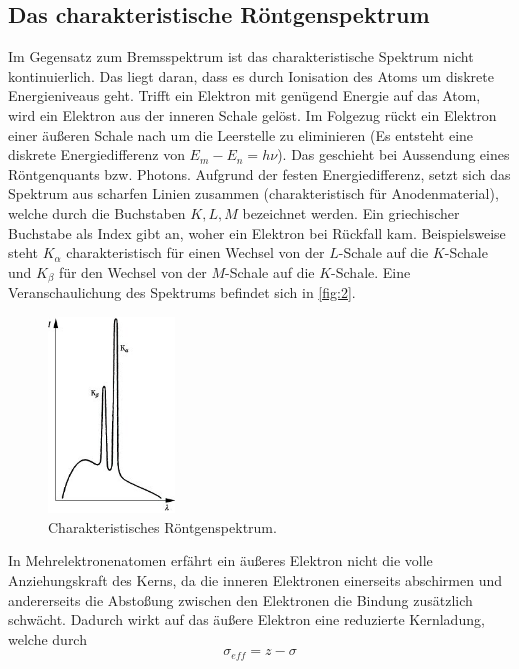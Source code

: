 \subsection{Das charakteristische Röntgenspektrum}
Im Gegensatz zum Bremsspektrum ist das charakteristische Spektrum nicht kontinuierlich.
Das liegt daran, dass es durch Ionisation des Atoms um diskrete Energieniveaus 
geht. Trifft ein Elektron mit genügend Energie auf das Atom, wird ein Elektron 
aus der inneren Schale gelöst. Im Folgezug rückt ein Elektron einer äußeren 
Schale nach um die Leerstelle zu eliminieren (Es entsteht eine diskrete 
Energiedifferenz von $E_m -E_n = h \nu$). Das geschieht bei Aussendung eines 
Röntgenquants bzw. Photons. Aufgrund der festen Energiedifferenz, setzt sich 
das Spektrum aus scharfen Linien zusammen (charakteristisch für Anodenmaterial),
welche durch die Buchstaben $K,L,M$ bezeichnet werden. Ein griechischer Buchstabe 
als Index gibt an, woher ein Elektron bei Rückfall kam. Beispielsweise steht 
$K_{\alpha}$ charakteristisch für einen Wechsel von der $L$-Schale auf die $K$-Schale 
und $K_{\beta}$ für den Wechsel von der $M$-Schale auf die $K$-Schale. Eine 
Veranschaulichung des Spektrums befindet sich in \autoref{fig:2}.
\begin{figure}[H]
    \centering
        \centering
        \includegraphics[width=0.3\textwidth]{bilder/char.jpg}
        \caption{Charakteristisches Röntgenspektrum. \cite{char}}
    \hfill
    \label{fig:2}
\end{figure}
\noindent In Mehrelektronenatomen erfährt ein äußeres Elektron nicht die volle Anziehungskraft 
des Kerns, da die inneren Elektronen einerseits abschirmen und andererseits 
die Abstoßung zwischen den Elektronen die Bindung zusätzlich schwächt. Dadurch 
wirkt auf das äußere Elektron eine reduzierte Kernladung, welche durch
\begin{equation}
    \sigma_{eff} = z - \sigma 
\end{equation}

